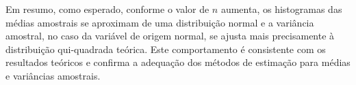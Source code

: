 \documentclass[]{abntex2}
\begin{document}
Em resumo, como esperado, conforme o valor de \(n\) aumenta, os histogramas das médias amostrais se aproximam de uma distribuição normal e a variância amostral, no caso da variável de origem normal, se ajusta mais precisamente à distribuição qui-quadrada teórica. Este comportamento é consistente com os resultados teóricos e confirma a adequação dos métodos de estimação para médias e variâncias amostrais.

\postextual


\end{document}
